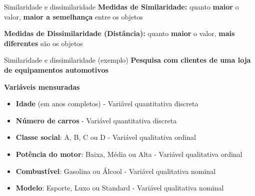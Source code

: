 \documentclass[
  ignorenonframetext,
  aspectratio=169,
]{beamer}
\begin{document}
\begin{frame}{Similaridade e dissimilaridade}
\protect{}\label{similaridade-e-dissimilaridade}
\textbf{Medidas de Similaridade:} quanto \textbf{maior} o valor,
\textbf{maior a semelhança} entre os objetos

\pause

\textbf{Medidas de Dissimilaridade (Distância):} quanto \textbf{maior} o
valor, \textbf{mais diferentes} são os objetos
\end{frame}

\begin{frame}{Similaridade e dissimilaridade (exemplo)}
\protect{}\label{similaridade-e-dissimilaridade-exemplo}
\textbf{Pesquisa com clientes de uma loja de equipamentos automotivos}

\pause

\textbf{Variáveis mensuradas}

\begin{itemize}
\item
  \textbf{Idade} (em anos completos) - Variável quantitativa discreta
\item
  \textbf{Número de carros} - Variável quantitativa discreta
\item
  \textbf{Classe social}: A, B, C ou D - Variável qualitativa ordinal
\item
  \textbf{Potência do motor}: Baixa, Média ou Alta - Variável
  qualitativa ordinal
\item
  \textbf{Combustível}: Gasolina ou Álcool - Variável qualitativa
  nominal
\item
  \textbf{Modelo}: Esporte, Luxo ou Standard - Variável qualitativa
  nominal
\end{itemize}
\end{frame}
\end{document}
